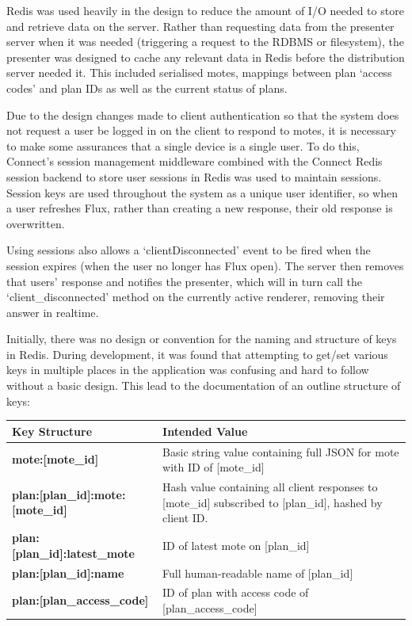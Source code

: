 \documentclass[a4papert,11pt,notitlepage]{ltxdoc}
\begin{document}
Redis was used heavily in the design to reduce the amount of I/O needed to store and retrieve data on the server. Rather than requesting data from the presenter server when it was needed (triggering a request to the RDBMS or filesystem), the presenter was designed to cache any relevant data in Redis before the distribution server needed it. This included serialised motes, mappings between plan `access codes' and plan IDs as well as the current status of plans.

Due to the design changes made to client authentication so that the system does not request a user be logged in on the client to respond to motes, it is necessary to make some assurances that a single device is a single user. To do this, Connect's session management middleware combined with the Connect Redis\cite{connectredis:web} session backend to store user sessions in Redis was used to maintain sessions. Session keys are used throughout the system as a unique user identifier, so when a user refreshes Flux, rather than creating a new response, their old response is overwritten.

Using sessions also allows a `clientDisconnected' event to be fired when the session expires (when the user no longer has Flux open). The server then removes that users' response and notifies the presenter, which will in turn call the `client\_disconnected' method on the currently active renderer, removing their answer in realtime.

Initially, there was no design or convention for the naming and structure of keys in Redis. During development, it was found that attempting to get/set various keys in multiple places in the application was confusing and hard to follow without a basic design. This lead to the documentation of an outline structure of keys:

\begin{tabular}{ l p{290pt} }
  \textbf{Key Structure} & \textbf{Intended Value} \\ \hline
  \textbf{mote:[mote\_id]} & Basic string value containing full JSON for mote with ID of [mote\_id] \\
  \textbf{plan:[plan\_id]:mote:[mote\_id]} & Hash value containing all client responses to [mote\_id] subscribed to [plan\_id], hashed by client ID. \\
  \textbf{plan:[plan\_id]:latest\_mote} & ID of latest mote on [plan\_id] \\
  \textbf{plan:[plan\_id]:name} & Full human-readable name of [plan\_id] \\
  \textbf{plan:[plan\_access\_code]} & ID of plan with access code of [plan\_access\_code] \\
\end{tabular}
\end{document}
